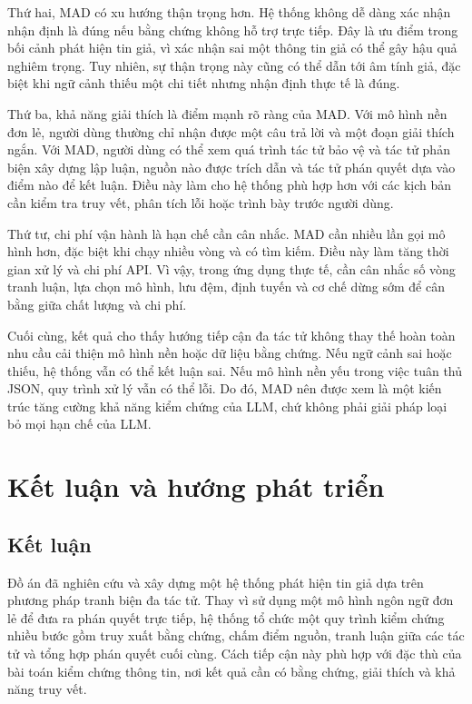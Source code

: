 ﻿\documentclass[oneside,a4paper,12pt]{extreport}
\begin{document}
Thứ hai, MAD có xu hướng thận trọng hơn. Hệ thống không dễ dàng xác nhận nhận định là đúng nếu bằng chứng không hỗ trợ trực tiếp. Đây là ưu điểm trong bối cảnh phát hiện tin giả, vì xác nhận sai một thông tin giả có thể gây hậu quả nghiêm trọng. Tuy nhiên, sự thận trọng này cũng có thể dẫn tới âm tính giả, đặc biệt khi ngữ cảnh thiếu một chi tiết nhưng nhận định thực tế là đúng.

Thứ ba, khả năng giải thích là điểm mạnh rõ ràng của MAD. Với mô hình nền đơn lẻ, người dùng thường chỉ nhận được một câu trả lời và một đoạn giải thích ngắn. Với MAD, người dùng có thể xem quá trình tác tử bảo vệ và tác tử phản biện xây dựng lập luận, nguồn nào được trích dẫn và tác tử phán quyết dựa vào điểm nào để kết luận. Điều này làm cho hệ thống phù hợp hơn với các kịch bản cần kiểm tra truy vết, phân tích lỗi hoặc trình bày trước người dùng.

Thứ tư, chi phí vận hành là hạn chế cần cân nhắc. MAD cần nhiều lần gọi mô hình hơn, đặc biệt khi chạy nhiều vòng và có tìm kiếm. Điều này làm tăng thời gian xử lý và chi phí API. Vì vậy, trong ứng dụng thực tế, cần cân nhắc số vòng tranh luận, lựa chọn mô hình, lưu đệm, định tuyến và cơ chế dừng sớm để cân bằng giữa chất lượng và chi phí.

Cuối cùng, kết quả cho thấy hướng tiếp cận đa tác tử không thay thế hoàn toàn nhu cầu cải thiện mô hình nền hoặc dữ liệu bằng chứng. Nếu ngữ cảnh sai hoặc thiếu, hệ thống vẫn có thể kết luận sai. Nếu mô hình nền yếu trong việc tuân thủ JSON, quy trình xử lý vẫn có thể lỗi. Do đó, MAD nên được xem là một kiến trúc tăng cường khả năng kiểm chứng của LLM, chứ không phải giải pháp loại bỏ mọi hạn chế của LLM.
\chapter{Kết luận và hướng phát triển}

\section{Kết luận}

Đồ án đã nghiên cứu và xây dựng một hệ thống phát hiện tin giả dựa trên phương pháp tranh biện đa tác tử. Thay vì sử dụng một mô hình ngôn ngữ đơn lẻ để đưa ra phán quyết trực tiếp, hệ thống tổ chức một quy trình kiểm chứng nhiều bước gồm truy xuất bằng chứng, chấm điểm nguồn, tranh luận giữa các tác tử và tổng hợp phán quyết cuối cùng. Cách tiếp cận này phù hợp với đặc thù của bài toán kiểm chứng thông tin, nơi kết quả cần có bằng chứng, giải thích và khả năng truy vết.
\end{document}
